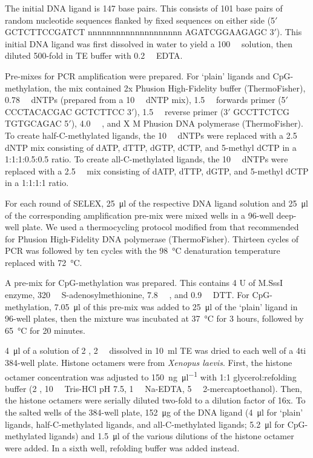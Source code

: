 \documentclass[parskip=full, numbers=noenddot]{scrreprt}
\begin{document}
The initial DNA ligand is 147 base pairs. This consists of 101 base pairs of random nucleotide sequences flanked by fixed sequences on either side (5$'$ GCTCTTCCGATCT nnnnnnnnnnnnnnnnnnnn AGATCGGAAGAGC 3$'$). This initial DNA ligand was first dissolved in water to yield a \SI{100}{\micro\Molar} solution, then diluted 500-fold in TE buffer with \SI{0.2}{\milli\Molar} EDTA.

Pre-mixes for PCR amplification were prepared. For `plain' ligands and CpG-methylation, the mix contained 2x Phusion High-Fidelity buffer (ThermoFisher), \SI{0.78}{\milli\Molar} dNTPs (prepared from a \SI{10}{\milli\Molar} dNTP mix), \SI{1.5}{\micro\Molar} forwards primer (5$'$ CCCTACACGAC GCTCTTCC 3$'$), \SI{1.5}{\micro\Molar} reverse primer (3$'$ GCCTTCTCG TGTGCAGAC 5$'$), \SI{4.0}{\micro\Molar} , and X M Phusion DNA polymerase (ThermoFisher). To create half-C-methylated ligands, the \SI{10}{\milli\Molar} dNTPs were replaced with a \SI{2.5}{\milli\Molar} dNTP mix consisting of dATP, dTTP, dGTP, dCTP, and 5-methyl dCTP in a 1:1:1:0.5:0.5 ratio. To create all-C-methylated ligands, the \SI{10}{\milli\Molar} dNTPs were replaced with a \SI{2.5}{\milli\Molar} mix consisting of dATP, dTTP, dGTP, and 5-methyl dCTP in a 1:1:1:1 ratio.


For each round of SELEX, \SI{25}{\micro\litre} of the respective DNA ligand solution and \SI{25}{\micro\litre} of the corresponding amplification pre-mix were mixed wells in a 96-well deep-well plate. We used a thermocycling protocol modified from that recommended for Phusion High-Fidelity DNA polymerase (ThermoFisher). Thirteen cycles of PCR was followed by ten cycles with the \SI{98}{\celsius} denaturation temperature replaced with \SI{72}{\celsius}.

A pre-mix for CpG-methylation was prepared. This contains 4 U of M.SssI enzyme, \SI{320}{\micro\Molar} S-adenosylmethionine, \SI{7.8}{\milli\Molar} ,
and \SI{0.9}{\milli\Molar} DTT. For CpG-methylation, \SI{7.05}{\micro\litre} of this pre-mix was added to \SI{25}{\micro\litre} of the `plain' ligand in 96-well plates, then the mixture was incubated at \SI{37}{\celsius} for 3 hours, followed by \SI{65}{\celsius} for 20 minutes.

\SI{4}{\micro\litre} of a solution of \SI{2}{\Molar} , \SI{2}{\milli\Molar}  dissolved in \SI{10}{\milli\litre} TE was dried to each well of a 4ti 384-well plate. Histone octamers were from \emph{Xenopus laevis}. First, the histone octamer concentration was adjusted to \SI{150}{\nano\gram\per\micro\litre} with 1:1 glycerol:refolding buffer (\SI{2}{\Molar} , \SI{10}{\milli\Molar} Tris-HCl pH 7.5, \SI{1}{\milli\Molar} Na-EDTA, \SI{5}{\milli\Molar} 2-mercaptoethanol). Then, the histone octamers were serially diluted two-fold to a dilution factor of 16x. To the salted wells of the 384-well plate, \SI{152}{\micro\gram} of the DNA ligand (\SI{4}{\micro\litre} for ‘plain’ ligands, half-C-methylated ligands, and all-C-methylated ligands; \SI{5.2}{\micro\litre} for CpG-methylated ligands) and \SI{1.5}{\micro\litre} of the various dilutions of the histone octamer were added. In a sixth well, refolding buffer was added instead.
\end{document}
